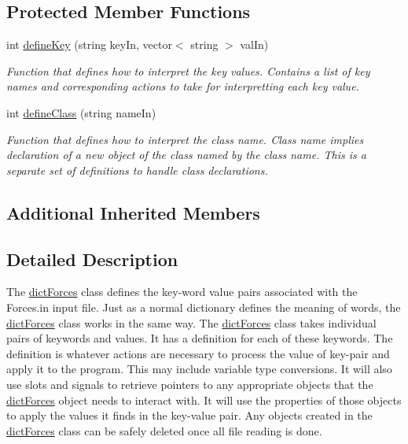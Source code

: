 \subsection*{Protected Member Functions}
\begin{DoxyCompactItemize}
\item 
int \hyperlink{classdict_forces_aa063da3300249600b1fcb60622d06759}{define\-Key} (string key\-In, vector$<$ string $>$ val\-In)
\begin{DoxyCompactList}\small\item\em Function that defines how to interpret the key values. Contains a list of key names and corresponding actions to take for interpretting each key value. \end{DoxyCompactList}\item 
int \hyperlink{classdict_forces_a1cd2da00aa2b4198af32786dd27eaf10}{define\-Class} (string name\-In)
\begin{DoxyCompactList}\small\item\em Function that defines how to interpret the class name. Class name implies declaration of a new object of the class named by the class name. This is a separate set of definitions to handle class declarations. \end{DoxyCompactList}\end{DoxyCompactItemize}
\subsection*{Additional Inherited Members}


\subsection{Detailed Description}
The \hyperlink{classdict_forces}{dict\-Forces} class defines the key-\/word value pairs associated with the Forces.\-in input file. Just as a normal dictionary defines the meaning of words, the \hyperlink{classdict_forces}{dict\-Forces} class works in the same way. The \hyperlink{classdict_forces}{dict\-Forces} class takes individual pairs of keywords and values. It has a definition for each of these keywords. The definition is whatever actions are necessary to process the value of key-\/pair and apply it to the program. This may include variable type conversions. It will also use slots and signals to retrieve pointers to any appropriate objects that the \hyperlink{classdict_forces}{dict\-Forces} object needs to interact with. It will use the properties of those objects to apply the values it finds in the key-\/value pair. Any objects created in the \hyperlink{classdict_forces}{dict\-Forces} class can be safely deleted once all file reading is done.

